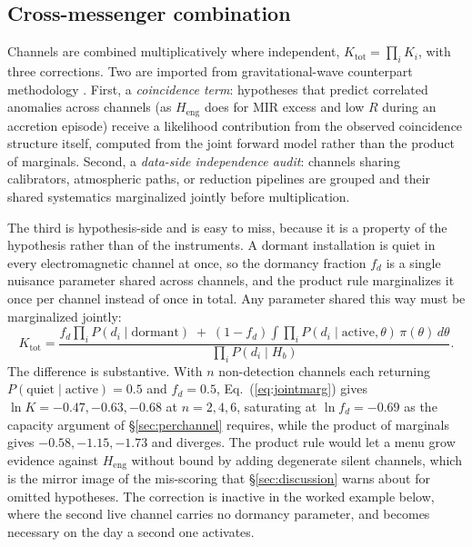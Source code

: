 \documentclass[11pt]{article}
\newcommand{\lnK}{\ensuremath{\ln K}}
\newcommand{\Heng}{\ensuremath{H_{\mathrm{eng}}}}
\begin{document}
\subsection{Cross-messenger combination}
\label{sec:combination}

Channels are combined multiplicatively where independent, $K_{\mathrm{tot}} = \prod_{i} K_{i}$, with three corrections. Two are imported from gravitational-wave counterpart methodology \citep{Ashton2018,Breschi2024}. First, a \emph{coincidence term}: hypotheses that predict correlated anomalies across channels (as \Heng{} does for MIR excess and low $R$ during an accretion episode) receive a likelihood contribution from the observed coincidence structure itself, computed from the joint forward model rather than the product of marginals. Second, a \emph{data-side independence audit}: channels sharing calibrators, atmospheric paths, or reduction pipelines are grouped and their shared systematics marginalized jointly before multiplication.

The third is hypothesis-side and is easy to miss, because it is a property of the hypothesis rather than of the instruments. A dormant installation is quiet in every electromagnetic channel at once, so the dormancy fraction $f_{d}$ is a single nuisance parameter shared across channels, and the product rule marginalizes it once per channel instead of once in total. Any parameter shared this way must be marginalized jointly:
\begin{equation}
K_{\mathrm{tot}} = \frac{f_{d}\prod_{i}P(d_{i}\mid\mathrm{dormant}) \;+\; (1-f_{d})\displaystyle\int\prod_{i}P(d_{i}\mid\mathrm{active},\theta)\,\pi(\theta)\,d\theta}{\prod_{i}P(d_{i}\mid H_{b})}.
\label{eq:jointmarg}
\end{equation}
The difference is substantive. With $n$ non-detection channels each returning $P(\mathrm{quiet}\mid\mathrm{active}) = 0.5$ and $f_{d} = 0.5$, Eq.~(\ref{eq:jointmarg}) gives $\lnK = -0.47, -0.63, -0.68$ at $n = 2, 4, 6$, saturating at $\ln f_{d} = -0.69$ as the capacity argument of \S\ref{sec:perchannel} requires, while the product of marginals gives $-0.58, -1.15, -1.73$ and diverges. The product rule would let a menu grow evidence against \Heng{} without bound by adding degenerate silent channels, which is the mirror image of the mis-scoring that \S\ref{sec:discussion} warns about for omitted hypotheses. The correction is inactive in the worked example below, where the second live channel carries no dormancy parameter, and becomes necessary on the day a second one activates.
\end{document}
